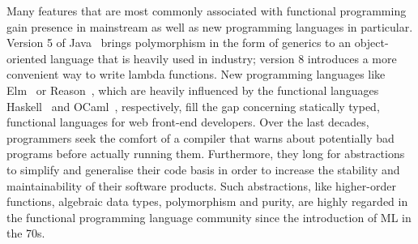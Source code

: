 %


Many features that are most commonly associated with functional programming gain presence in mainstream as well as new programming languages in particular.
Version 5 of Java~\citep{arnold2005java} brings polymorphism in the form of generics to an object\--oriented language that is heavily used in industry; version 8 introduces a more convenient way to write lambda functions.
New programming languages like Elm~\citep{czaplicki2012elm} or Reason~\citep{2019reasonml}, which are heavily influenced by the functional languages Haskell~\citep{jones2002haskell} and OCaml~\citep{minsky2013real}, respectively, fill the gap concerning statically typed, functional languages for web front\--end developers.
Over the last decades, programmers seek the comfort of a compiler that warns about potentially bad programs before actually running them.
Furthermore, they long for abstractions to simplify and generalise their code basis in order to increase the stability and maintainability of their software products.
Such abstractions, like higher\--order functions, algebraic data types, polymorphism and purity, are highly regarded in the functional programming language community since the introduction of ML in the 70s.

